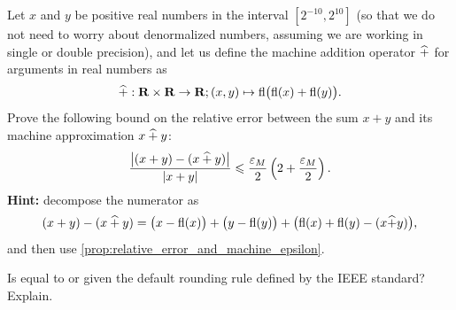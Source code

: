\begin{exercise}
    Let $x$ and $y$ be positive real numbers in the interval $[2^{-10}, 2^{10}]$
    (so that we do not need to worry about denormalized numbers,
    assuming we are working in single or double precision),
    and let us define the machine addition operator $\mathbin{\widehat +}$ for arguments in real numbers as
    \[
        \mathbin{\widehat +}: \mathbf R \times \mathbf R \to \mathbf R; (x, y) \mapsto {\rm fl} \bigl({\rm fl}(x) + {\rm fl}(y)\bigr).
    \]
    Prove the following bound on the relative error between the sum $x+y$ and its machine approximation $x \mathbin{\widehat +} y$:
    \[
        \frac{\bigl| (x + y) - (x \mathbin{\widehat +}  y ) \bigr|}{|x + y|}
        \leqslant \frac{\varepsilon_M}{2}  \left(2 + \frac{\varepsilon_M}{2}\right).
    \]
    \textbf{Hint:} decompose the numerator as
    \[
        (x + y) - (x \mathbin{\widehat +}  y ) = \bigl(x - {\rm fl}(x)\bigr) + \bigl(y - {\rm fl}(y)\bigr) + \bigl( {\rm fl}(x) + {\rm fl}(y) - (x \widehat + y)\bigr),
    \]
    and then use \cref{prop:relative_error_and_machine_epsilon}.
\end{exercise}

\begin{exercise}
    \label{exercise:floating_point_illustration}
    Is  equal to  or 
    given the default rounding rule defined by the IEEE standard? Explain.
\end{exercise}


